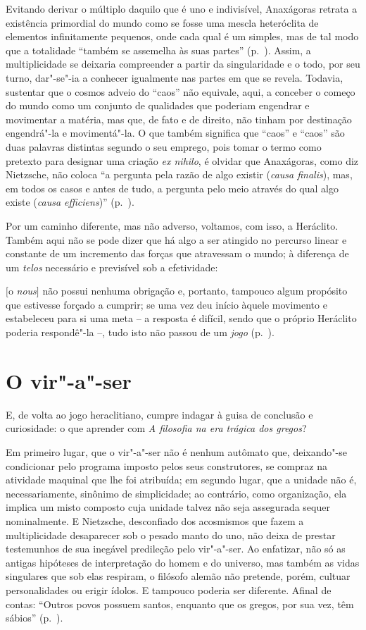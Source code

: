 Evitando derivar o múltiplo daquilo que é uno e indivisível, Anaxágoras
retrata a existência primordial do mundo como se fosse uma mescla
heteróclita de elementos infinitamente pequenos, onde cada qual é um
simples, mas de tal modo que a totalidade ``também se
assemelha às suas partes'' (p.~\pageref{suaspartes}).
Assim, a multiplicidade se deixaria compreender a partir da
singularidade e o todo, por seu turno, dar"-se"-ia a conhecer igualmente
nas partes em que se revela. Todavia, sustentar que o cosmos adveio do
``caos'' não equivale, aqui, a conceber o começo do mundo como um
conjunto de qualidades que poderiam engendrar e movimentar a matéria,
mas que, de fato e de direito, não tinham por destinação engendrá"-la e
movimentá"-la. O que também significa que ``caos'' e ``caos'' são duas
palavras distintas segundo o seu emprego, pois tomar o termo como
pretexto para designar uma criação \textit{ex nihilo}, é olvidar que
Anaxágoras, como diz Nietzsche, não coloca ``a pergunta
pela razão de algo existir (\textit{causa finalis}), mas, em todos os
casos e antes de tudo, a pergunta pelo meio através do qual algo existe
(\textit{causa efficiens})'' (p.~\pageref{causafinalis}).

Por um caminho diferente, mas não adverso, voltamos, com isso, a
Heráclito. Também aqui não se pode dizer que há algo a ser atingido no
percurso linear e constante de um incremento das forças que atravessam
o mundo; à diferença de um \textit{telos} necessário e previsível sob a
efetividade: 

\begin{hedraquote} 
$[$o \textit{nous}$]$ não possui nenhuma
obrigação e, portanto, tampouco algum propósito que estivesse forçado a
cumprir; se uma vez deu início àquele movimento e estabeleceu para si
uma meta -- a resposta é difícil, sendo que o próprio Heráclito poderia
respondê"-la --, tudo isto não passou de um
\textit{jogo} (p.~\pageref{naopossuinenhuma}).
\end{hedraquote} 

\section{O vir"-a"-ser}
E, de volta
ao jogo heraclitiano, cumpre indagar à guisa de conclusão e
curiosidade: o que aprender com \textit{A filosofia na era trágica dos
gregos}?

Em primeiro lugar, que o vir"-a"-ser não é nenhum autômato que,
deixando"-se condicionar pelo programa imposto pelos seus construtores,
se compraz na atividade maquinal que lhe foi atribuída; em segundo
lugar, que a unidade não é, necessariamente, sinônimo de simplicidade;
ao contrário, como organização, ela implica um misto composto cuja
unidade talvez não seja assegurada sequer nominalmente. E Nietzsche,
desconfiado dos acosmismos que fazem a multiplicidade desaparecer sob o
pesado manto do uno, não deixa de prestar testemunhos de sua inegável
predileção pelo vir"-a"-ser. Ao enfatizar, não só as antigas hipóteses de
interpretação do homem e do universo, mas também as vidas singulares que sob
elas respiram, o filósofo alemão não pretende, porém, cultuar
personalidades ou erigir ídolos. E tampouco poderia ser diferente.
Afinal de contas: ``Outros povos possuem santos, enquanto
que os gregos, por sua vez, têm sábios'' (p.~\pageref{santos}).
